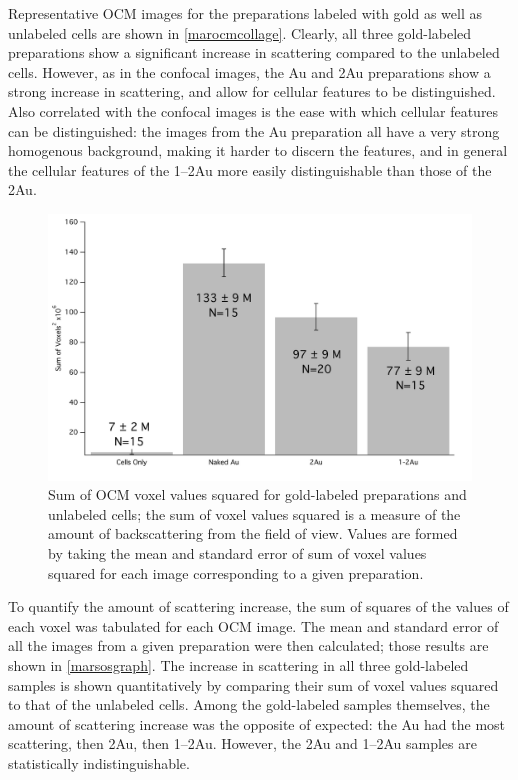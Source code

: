 Representative OCM images for the preparations labeled with gold as well as unlabeled cells are shown in \autoref{marocmcollage}. Clearly, all three gold-labeled preparations show a significant increase in scattering compared to the unlabeled cells. However, as in the confocal images, the Au and 2Au preparations show a strong increase in scattering, and allow for cellular features to be distinguished. Also correlated with the confocal images is the ease with which cellular features can be distinguished: the images from the Au preparation all have a very strong homogenous background, making it harder to discern the features, and in general the cellular features of the 1--2Au more easily distinguishable than those of the 2Au.

\begin{figure}[htb]
\centering
\includegraphics[keepaspectratio,width=\textwidth,height=0.75\textheight]{6marSOSgraph.pdf}
\caption{Sum of OCM voxel values squared for gold-labeled preparations and unlabeled cells; the sum of voxel values squared is a measure of the amount of backscattering from the field of view. Values are formed by taking the mean and standard error of sum of voxel values squared for each image corresponding to a given preparation.}
\label{marsosgraph}
\end{figure}


To quantify the amount of scattering increase, the sum of squares of the values of each voxel was tabulated for each OCM image. The mean and standard error of all the images from a given preparation were then calculated; those results are shown in \autoref{marsosgraph}. The increase in scattering in all three gold-labeled samples is shown quantitatively by comparing their sum of voxel values squared to that of the unlabeled cells. Among the gold-labeled samples themselves, the amount of scattering increase was the opposite of expected: the Au had the most scattering, then 2Au, then 1--2Au. However, the 2Au and 1--2Au samples are statistically indistinguishable.

